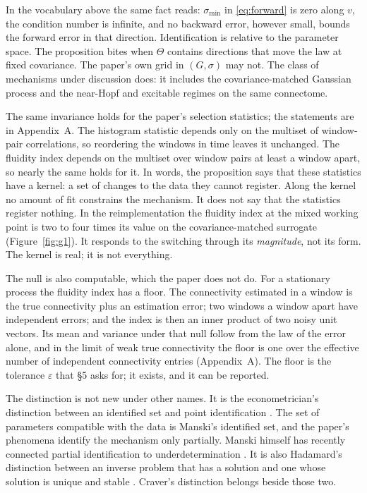 \documentclass[11pt]{article}
\theoremstyle{definition}\newtheorem{observation}{Observation}
\theoremstyle{remark}\newtheorem{remark}{Remark}
\begin{document}
In the vocabulary above the same fact reads: $\sigma_{\min}$ in \eqref{eq:forward} is zero along $v$, the condition number is infinite, and no backward error, however small, bounds the forward error in that direction. Identification is relative to the parameter space. The proposition bites when $\Theta$ contains directions that move the law at fixed covariance. The paper's own grid in $(G,\sigma)$ may not. The class of mechanisms under discussion does: it includes the covariance-matched Gaussian process and the near-Hopf and excitable regimes on the same connectome.

The same invariance holds for the paper's selection statistics; the statements are in Appendix~A. The histogram statistic depends only on the multiset of window-pair correlations, so reordering the windows in time leaves it unchanged. The fluidity index depends on the multiset over window pairs at least a window apart, so nearly the same holds for it. In words, the proposition says that these statistics have a kernel: a set of changes to the data they cannot register. Along the kernel no amount of fit constrains the mechanism. It does not say that the statistics register nothing. In the reimplementation the fluidity index at the mixed working point is two to four times its value on the covariance-matched surrogate (Figure~\ref{fig:g1}). It responds to the switching through its \emph{magnitude}, not its form. The kernel is real; it is not everything.

The null is also computable, which the paper does not do. For a stationary process the fluidity index has a floor. The connectivity estimated in a window is the true connectivity plus an estimation error; two windows a window apart have independent errors; and the index is then an inner product of two noisy unit vectors. Its mean and variance under that null follow from the law of the error alone, and in the limit of weak true connectivity the floor is one over the effective number of independent connectivity entries (Appendix~A). The floor is the tolerance $\varepsilon$ that \S5 asks for; it exists, and it can be reported.

The distinction is not new under other names. It is the econometrician's distinction between an identified set and point identification \parencite{koopmans1950,manski2003}. The set of parameters compatible with the data is Manski's identified set, and the paper's phenomena identify the mechanism only partially. Manski himself has recently connected partial identification to underdetermination \parencite{manski2026}. It is also Hadamard's distinction between an inverse problem that has a solution and one whose solution is unique and stable \parencite{engl1996}. Craver's distinction belongs beside those two.
\end{document}
